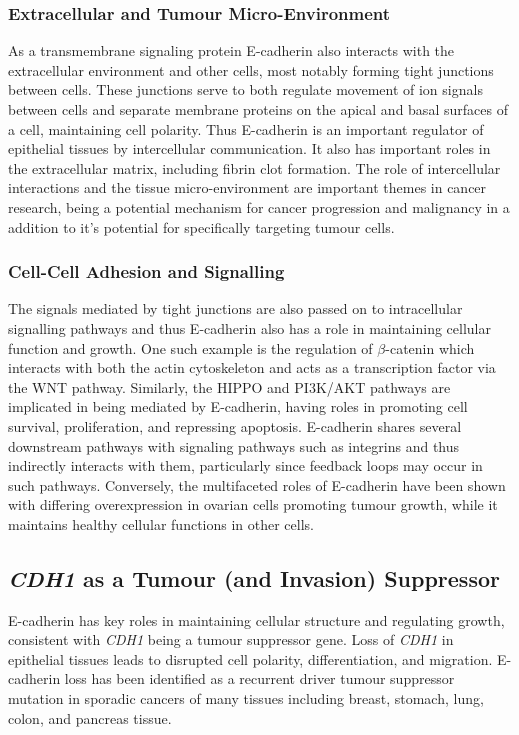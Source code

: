 \subsubsection{Extracellular and Tumour Micro-Environment}
As a transmembrane signaling protein E-cadherin also interacts with the extracellular environment and other cells, most notably forming tight junctions between cells. These junctions serve to both regulate movement of ion signals between cells and separate membrane proteins on the apical and basal surfaces of a cell, maintaining cell polarity. Thus E-cadherin is an important regulator of epithelial tissues by intercellular communication. It also has important roles in the extracellular matrix, including fibrin clot formation. The role of intercellular interactions and the tissue micro-environment are important themes in cancer research, being a potential mechanism for cancer progression and malignancy in a addition to it's potential for specifically targeting tumour cells.

\subsubsection{Cell-Cell Adhesion and Signalling}
The signals mediated by tight junctions are also passed on to intracellular signalling pathways and thus E-cadherin also has a role in maintaining cellular function and growth. One such example is the regulation of $\beta$-catenin which interacts with both the actin cytoskeleton and acts as a transcription factor via the WNT pathway. Similarly, the HIPPO and PI3K/AKT pathways are implicated in being mediated by E-cadherin, having roles in promoting cell survival, proliferation, and repressing apoptosis. E-cadherin shares several downstream pathways with signaling pathways such as integrins and thus indirectly interacts with them, particularly since feedback loops may occur in such pathways. Conversely, the multifaceted roles of E-cadherin have been shown with differing overexpression in ovarian cells promoting tumour growth, while it maintains healthy cellular functions in other cells.

\subsection{\textit{CDH1} as a Tumour (and Invasion) Suppressor}
E-cadherin has key roles in maintaining cellular structure and regulating growth, consistent with \textit{CDH1} being a tumour suppressor gene. Loss of \textit{CDH1} in epithelial tissues leads to disrupted cell polarity, differentiation, and  migration. E-cadherin loss has been identified as a recurrent driver tumour suppressor mutation in sporadic cancers of many tissues including breast, stomach, lung, colon, and pancreas tissue.


